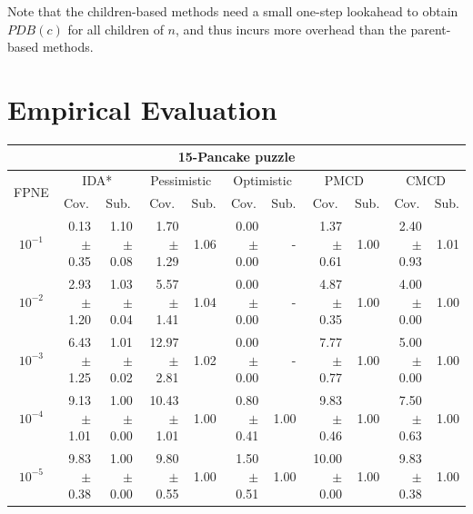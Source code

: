\documentclass[letterpaper]{article}
\begin{document}
Note that the children-based methods need a small one-step lookahead to obtain $PDB(c)$ for all children of $n$, and thus incurs more overhead than the parent-based methods.









\section{Empirical Evaluation}








\begin{table}[t]
\centering
\setlength{\tabcolsep}{4 pt}
\begin{tabular}{| c | r  r | r  r | r  r | r  r | r  r |}
\hline
\multicolumn{11}{|c|}{\textbf{15-Pancake puzzle}} \\
\hline
\multirow{2}{*}{FPNE}	& \multicolumn{2}{|c|}{IDA*} 	& \multicolumn{2}{|c|}{Pessimistic} 	& \multicolumn{2}{|c|}{Optimistic} 	& \multicolumn{2}{|c|}{PMCD} 	& \multicolumn{2}{|c|}{CMCD} 	\\
\cline{2-11}
& \multicolumn{1}{c}{Cov.} & \multicolumn{1}{c|}{Sub.} 	& \multicolumn{1}{c}{Cov.} & \multicolumn{1}{c|}{Sub.} 	& \multicolumn{1}{c}{Cov.} & \multicolumn{1}{c|}{Sub.} 	& \multicolumn{1}{c}{Cov.} & \multicolumn{1}{c|}{Sub.} 	& \multicolumn{1}{c}{Cov.} & \multicolumn{1}{c|}{Sub.} 	\\
\hline


$10^{-1}$	& 0.13 $\pm$ 0.35	& 1.10 $\pm$ 0.08	& 1.70 $\pm$ 1.29	& 1.06	& 0.00 $\pm$ 0.00	& - 	& 1.37 $\pm$ 0.61	& 1.00	& 2.40 $\pm$ 0.93	& 1.01	\\

$10^{-2}$	& 2.93 $\pm$ 1.20	& 1.03 $\pm$ 0.04	& 5.57 $\pm$ 1.41	& 1.04	& 0.00 $\pm$ 0.00	& - 	& 4.87 $\pm$ 0.35	& 1.00	& 4.00 $\pm$ 0.00	& 1.00	\\

$10^{-3}$	& 6.43 $\pm$ 1.25	& 1.01 $\pm$ 0.02	& 12.97 $\pm$ 2.81	& 1.02	& 0.00 $\pm$ 0.00	& - 	& 7.77 $\pm$ 0.77	& 1.00	& 5.00 $\pm$ 0.00	& 1.00	\\

$10^{-4}$	& 9.13 $\pm$ 1.01	& 1.00 $\pm$ 0.00	& 10.43 $\pm$ 1.01	& 1.00	& 0.80 $\pm$ 0.41	& 1.00	& 9.83 $\pm$ 0.46	& 1.00	& 7.50 $\pm$ 0.63	& 1.00	\\

$10^{-5}$	& 9.83 $\pm$ 0.38	& 1.00 $\pm$ 0.00	& 9.80 $\pm$ 0.55	& 1.00	& 1.50 $\pm$ 0.51	& 1.00	& 10.00 $\pm$ 0.00	& 1.00	& 9.83 $\pm$ 0.38	& 1.00	\\




\end{tabular}
\end{table}
\end{document}
